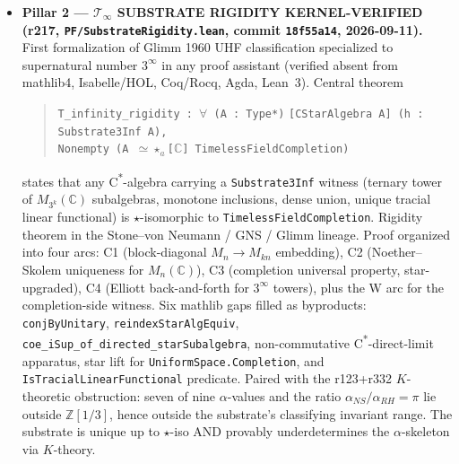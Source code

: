 \begin{itemize}
\item \textbf{Pillar 2 --- $\mathcal{T}_\infty$ SUBSTRATE RIGIDITY
KERNEL-VERIFIED (r217, \texttt{PF/SubstrateRigidity.lean}, commit
\texttt{18f55a14}, 2026-09-11).} First formalization of Glimm 1960
UHF classification specialized to supernatural number
$3^\infty$ in any proof assistant (verified absent from mathlib4,
Isabelle/HOL, Coq/Rocq, Agda, Lean~3). Central theorem
\begin{quote}
\texttt{T\_infinity\_rigidity : $\forall$ (A : Type*)}
\texttt{[CStarAlgebra A] (h : Substrate3Inf A),}\\
\texttt{Nonempty (A $\simeq\star_a$[$\mathbb{C}$] TimelessFieldCompletion)}
\end{quote}
states that any C\textsuperscript{*}-algebra carrying a
\texttt{Substrate3Inf} witness (ternary tower of $M_{3^k}(\mathbb{C})$
subalgebras, monotone inclusions, dense union, unique tracial
linear functional) is \texttt{$\star$}-isomorphic to
\texttt{TimelessFieldCompletion}. Rigidity theorem in the
Stone--von Neumann / GNS / Glimm lineage. Proof organized into four
arcs: C1 (block-diagonal $M_n \to M_{kn}$ embedding), C2
(Noether--Skolem uniqueness for $M_n(\mathbb{C})$), C3 (completion
universal property, star-upgraded), C4 (Elliott back-and-forth for
$3^\infty$ towers), plus the W arc for the completion-side witness.
Six mathlib gaps filled as byproducts: \texttt{conjByUnitary},
\texttt{reindexStarAlgEquiv},
\texttt{coe\_iSup\_of\_directed\_starSubalgebra}, non-commutative
C\textsuperscript{*}-direct-limit apparatus, star lift for
\texttt{UniformSpace.Completion}, and \texttt{IsTracialLinearFunctional}
predicate. Paired with the r123+r332 $K$-theoretic obstruction:
seven of nine $\alpha$-values and the ratio $\alpha_{NS}/\alpha_{RH}=\pi$
lie outside $\mathbb{Z}[1/3]$, hence outside the substrate's classifying
invariant range. The substrate is unique up to
\texttt{$\star$}-iso AND provably underdetermines the
$\alpha$-skeleton via $K$-theory.


\end{itemize}
